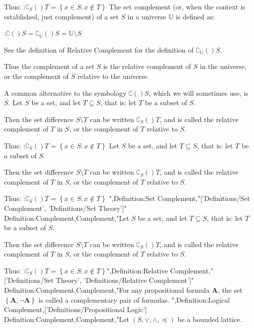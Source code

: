 Thus:
:$\complement_{S} \left(   \right)T = \left\lbrace x \in S : x \notin T \right\rbrace$
The set complement (or, when the context is established, just complement) of a set $S$ in a universe $\mathbb U$ is defined as:

:$\complement \left(   \right)S = \complement_{\mathbb U} \left(   \right)S = \mathbb U \setminus S$

See the definition of Relative Complement for the definition of $\complement_{\mathbb U} \left(   \right)S$.


Thus the complement of a set $S$ is the relative complement of $S$ in the universe, or the complement of $S$ relative to the universe.

A common alternative to the symbology $\complement \left(   \right)S$, which we will sometimes use, is $\overline S$.
Let $S$ be a set, and let $T \subseteq S$, that is: let $T$ be a subset of $S$.

Then the set difference $S \setminus T$ can be written $\complement_{S} \left(   \right)T$, and is called the relative complement of $T$ in $S$, or the complement of $T$ relative to $S$.

Thus:
:$\complement_{S} \left(   \right)T = \left\lbrace x \in S : x \notin T \right\rbrace$
Let $S$ be a set, and let $T \subseteq S$, that is: let $T$ be a subset of $S$.

Then the set difference $S \setminus T$ can be written $\complement_{S} \left(   \right)T$, and is called the relative complement of $T$ in $S$, or the complement of $T$ relative to $S$.

Thus:
:$\complement_{S} \left(   \right)T = \left\lbrace x \in S : x \notin T \right\rbrace$
",Definition:Set Complement,"['Definitions/Set Complement', 'Definitions/Set Theory']"
Definition:Complement,Complement,"Let $S$ be a set, and let $T \subseteq S$, that is: let $T$ be a subset of $S$.

Then the set difference $S \setminus T$ can be written $\complement_{S} \left(   \right)T$, and is called the relative complement of $T$ in $S$, or the complement of $T$ relative to $S$.

Thus:
:$\complement_{S} \left(   \right)T = \left\lbrace x \in S : x \notin T \right\rbrace$",Definition:Relative Complement,"['Definitions/Set Theory', 'Definitions/Relative Complement']"
Definition:Complement,Complement,"For any propositional formula $\mathbf A$, the set $\left\{{\mathbf A, \neg \mathbf A}\right\}$ is called a complementary pair of formulas.
",Definition:Logical Complement,['Definitions/Propositional Logic']
Definition:Complement,Complement,"Let $\left( S, \vee, \wedge, \preceq \right)$ be a bounded lattice.

